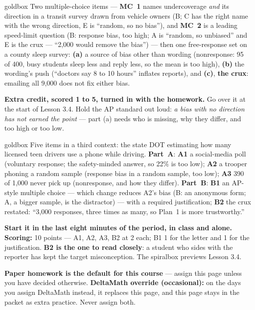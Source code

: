 \documentclass[10pt]{article}
\begin{document}
\boxguard
\begin{skillbox}{goldbox}
Two multiple-choice items --- \textbf{MC~1} names undercoverage \emph{and} its direction in a
transit survey drawn from vehicle owners (B; C has the right name with the wrong direction, E
is ``random, so no bias''), and \textbf{MC~2} is a leading speed-limit question (B: response
bias, too high; A is ``random, so unbiased'' and E is the crux --- ``2{,}000 would remove the
bias'') --- then one free-response set on a county sleep survey: \textbf{(a)} a source of bias
other than wording (nonresponse: 95 of 400, busy students sleep less and reply less, so the mean
is too high), \textbf{(b)} the wording's push (``doctors say 8 to 10 hours'' inflates reports),
and \textbf{(c)}, \textbf{the crux}: emailing all 9{,}000 does not fix either bias.

\textbf{Extra credit, scored 1 to 5, turned in with the homework.} Go over it at
the start of Lesson 3.4. Hold the AP standard out loud: \emph{a bias with no direction has not
earned the point} --- part (a) needs who is missing, why they differ, and too high or too low.
\end{skillbox}

\boxguard
\begin{skillbox}{goldbox}
Five items in a third context: the state DOT estimating how many licensed teen drivers use a
phone while driving. \textbf{Part~A}: \textbf{A1} a social-media poll (voluntary response; the
safety-minded answer, so 22\% is too low); \textbf{A2} a trooper phoning a random sample
(response bias in a random sample, too low); \textbf{A3} 390 of 1{,}000 never pick up
(nonresponse, and how they differ). \textbf{Part~B}: \textbf{B1} an AP-style multiple choice ---
which change reduces A2's bias (B: an anonymous form; A, a bigger sample, is the distractor) ---
with a required justification; \textbf{B2} the crux restated: ``3{,}000 responses, three times
as many, so Plan~1 is more trustworthy.''

\textbf{Start it in the last eight minutes of the period, in class and alone.}
\textbf{Scoring:} 10 points --- A1, A2, A3, B2 at 2 each; B1 1 for the letter and 1 for the
justification. \textbf{B2 is the one to read closely}: a student who sides with the reporter has
kept the target misconception. The spiralbox previews Lesson 3.4.

\textbf{Paper homework is the default for this course} --- assign this page unless you have
decided otherwise. \textbf{DeltaMath override (occasional):} on the days you assign DeltaMath
instead, it replaces this page, and this page stays in the packet as extra practice. Never
assign both.
\end{skillbox}
\end{document}

